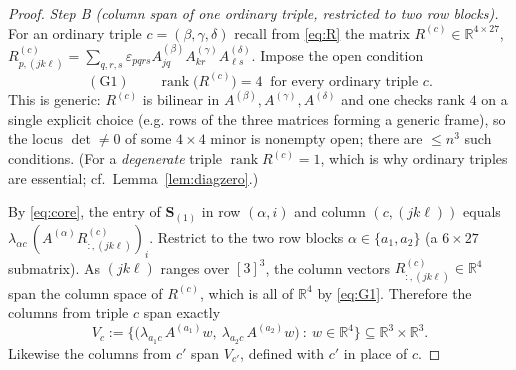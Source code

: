 \begin{proof}
\medskip\noindent\emph{Step B (column span of one ordinary triple, restricted to two row
blocks).}
For an ordinary triple $c=(\beta,\gamma,\delta)$ recall from \eqref{eq:R} the matrix
$R^{(c)}\in\mathbb R^{4\times27}$, $R^{(c)}_{p,(jk\ell)}=\sum_{q,r,s}\varepsilon_{pqrs}
A^{(\beta)}_{jq}A^{(\gamma)}_{kr}A^{(\delta)}_{\ell s}$. Impose the open condition
\begin{equation}\label{eq:G1}
\operatorname{(G1)}\qquad\operatorname{rank}\big(R^{(c)}\big)=4\ \text{ for every ordinary triple }c .
\end{equation}
This is generic: $R^{(c)}$ is bilinear in $A^{(\beta)},A^{(\gamma)},A^{(\delta)}$ and one
checks rank $4$ on a single explicit choice (e.g. rows of the three matrices forming a
generic frame), so the locus $\det\ne0$ of some $4\times4$ minor is nonempty open; there are
$\le n^3$ such conditions. (For a \emph{degenerate} triple $\operatorname{rank}R^{(c)}=1$,
which is why ordinary triples are essential; cf.\ Lemma~\ref{lem:diagzero}.)

By \eqref{eq:core}, the entry of $\mathbf S_{(1)}$ in row $(\alpha,i)$ and column
$(c,(jk\ell))$ equals $\lambda_{\alpha c}\,(A^{(\alpha)}R^{(c)}_{:,(jk\ell)})_i$. Restrict to
the two row blocks $\alpha\in\{a_1,a_2\}$ (a $6\times27$ submatrix). As $(jk\ell)$ ranges over
$[3]^3$, the column vectors $R^{(c)}_{:,(jk\ell)}\in\mathbb R^4$ span the column space of
$R^{(c)}$, which is all of $\mathbb R^4$ by \eqref{eq:G1}. Therefore the columns from triple
$c$ span exactly
\begin{equation}\label{eq:Vc}
V_c:=\Big\{\big(\lambda_{a_1 c}\,A^{(a_1)}w,\ \lambda_{a_2 c}\,A^{(a_2)}w\big)\ :\ w\in\mathbb R^4\Big\}
\subseteq\mathbb R^3\times\mathbb R^3 .
\end{equation}
Likewise the columns from $c'$ span $V_{c'}$, defined with $c'$ in place of $c$.


\end{proof}
